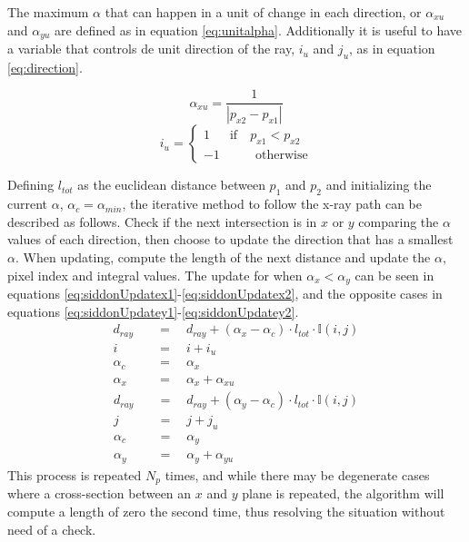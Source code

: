 The maximum $\alpha$ that can happen in a unit of change in each direction, or $\alpha_{xu}$ and $\alpha_{yu}$ are defined as in equation \ref{eq:unitalpha}. Additionally it is useful to have a variable that controls de unit direction of the ray, $i_u$ and $j_u$, as in equation \ref{eq:direction}.

\begin{equation}
\alpha_{xu}=\frac{1}{\left|p_{x2}-p_{x1} \right|}\label{eq:unitalpha}
\end{equation}
\begin{equation}
i_u=
\begin{cases}
1 & \text{if}\quad p_{x1}< p_{x2}\\
-1 &\quad\quad\text{otherwise}
\end{cases}\label{eq:direction}
\end{equation}

Defining $l_{tot}$ as the euclidean distance between $p_1$ and $p_2$ and initializing the current $\alpha$, $\alpha_c=\alpha_{min}$, the iterative method to follow the x-ray path can be described as follows. Check if the next intersection is in $x$ or $y$ comparing the $\alpha$ values of each direction, then choose to update the direction that has a smallest $\alpha$. When updating, compute the length of the next distance and update the $\alpha$, pixel index and integral values. The update for when $\alpha_x<\alpha_y$ can be seen in equations \ref{eq:siddonUpdatex1}-\ref{eq:siddonUpdatex2}, and the opposite cases in equations  \ref{eq:siddonUpdatey1}-\ref{eq:siddonUpdatey2}.
\begin{align}
d_{ray}\quad&=\quad d_{ray}+(\alpha_x-\alpha_c)\cdot l_{tot} \cdot\mathbb{I}(i,j)\label{eq:siddonUpdatex1}\\
i\quad&=\quad i+i_u\\
\alpha_c\quad&=\quad\alpha_x\\
\alpha_x\quad&=\quad\alpha_x+\alpha_{xu}\label{eq:siddonUpdatex2}
\end{align}
\begin{align}
d_{ray}\quad&=\quad d_{ray}+(\alpha_y-\alpha_c)\cdot l_{tot}\cdot\mathbb{I}(i,j)\label{eq:siddonUpdatey1}\\
j\quad&=\quad j+j_u\\
\alpha_c\quad&=\quad\alpha_y\\
\alpha_y\quad&=\quad\alpha_y+\alpha_{yu}\label{eq:siddonUpdatey2}
\end{align}
This process is repeated $N_p$ times, and while there may be degenerate cases where a cross-section between an $x$ and $y$ plane is repeated, the algorithm will compute a length of zero the second time, thus resolving the situation without need of a check.




